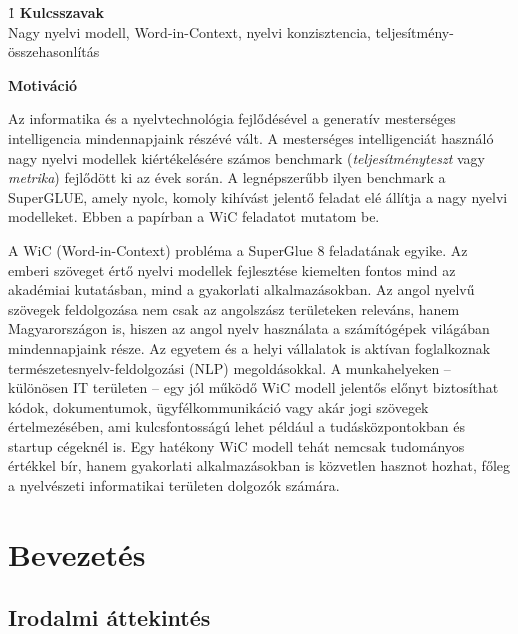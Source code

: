 \documentclass[12pt]{report}
\theoremstyle{definition}
\begin{document}
\h1 \textbf{Kulcsszavak}
        \\
       Nagy nyelvi modell, Word-in-Context, nyelvi konzisztencia, teljesítmény-összehasonlítás

\tableofcontents

\clearpage

{\Large\bf Motiváció }

Az informatika és a nyelvtechnológia fejlődésével a generatív mesterséges intelligencia mindennapjaink részévé vált. A mesterséges intelligenciát használó nagy nyelvi modellek kiértékelésére számos benchmark (\textit{teljesítményteszt} vagy \textit{metrika}) fejlődött ki az évek során. A legnépszerűbb ilyen benchmark a
SuperGLUE, amely nyolc, komoly kihívást jelentő feladat elé állítja a nagy nyelvi modelleket. Ebben a papírban a WiC feladatot mutatom be.

A WiC (Word-in-Context) probléma a SuperGlue 8 feladatának egyike. Az emberi szöveget értő nyelvi modellek fejlesztése kiemelten fontos mind az akadémiai kutatásban, mind a gyakorlati alkalmazásokban. Az angol nyelvű szövegek feldolgozása nem csak az angolszász területeken releváns, hanem Magyarországon is, hiszen az angol nyelv használata a számítógépek világában mindennapjaink része. Az egyetem és a helyi vállalatok is aktívan foglalkoznak természetesnyelv-feldolgozási (NLP) megoldásokkal. A munkahelyeken – különösen IT területen – egy jól működő WiC modell jelentős előnyt biztosíthat kódok, dokumentumok, ügyfélkommunikáció vagy akár jogi szövegek értelmezésében, ami kulcsfontosságú lehet például a tudásközpontokban és startup cégeknél is. Egy hatékony WiC modell tehát nemcsak tudományos értékkel bír, hanem gyakorlati alkalmazásokban is közvetlen hasznot hozhat, főleg a nyelvészeti informatikai területen dolgozók számára.
\clearpage

\chapter*{Bevezetés}

\section*{Irodalmi áttekintés}

\end{document}
